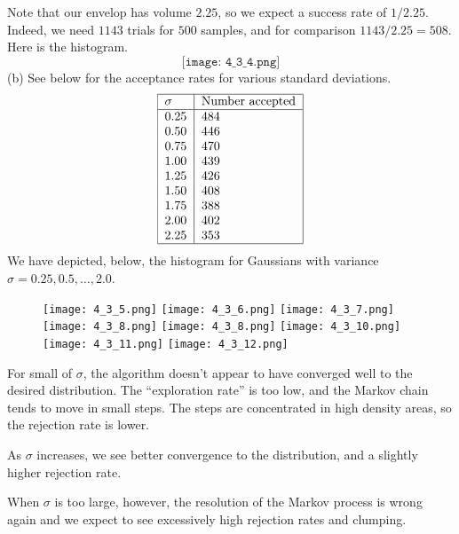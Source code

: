 \documentclass[12pt]{article}
\theoremstyle{remark}
\begin{document}
Note that our envelop has volume $2.25$, so we expect a success rate of $1/2.25$. Indeed, we need $1143$ trials for $500$ samples, and for comparison $1143/2.25 = 508$. Here is the histogram. 
\[
\texttt{[image: 4\_3\_4.png]}
\]
(b) See below for the acceptance rates for various standard deviations.
\[
\begin{tabular}{|l|l|}
\hline
$\sigma$ & Number accepted \\
\hline
$0.25$  & 484 \\
$0.50$ & 446 \\
$0.75$ & 470 \\
$1.00$  & 439 \\
$1.25$ & 426 \\
$1.50$ & 408 \\
$1.75$ & 388 \\
$2.00$ & 402 \\
$2.25$ & 353 \\
\hline
\end{tabular}
\]
We have depicted, below, the histogram for Gaussians with variance $\sigma = 0.25, 0.5, \ldots, 2.0$. 
\begin{figure}[!h]
\texttt{[image: 4\_3\_5.png]}
\texttt{[image: 4\_3\_6.png]} 
\texttt{[image: 4\_3\_7.png]}
\texttt{[image: 4\_3\_8.png]}
\texttt{[image: 4\_3\_8.png]}
\texttt{[image: 4\_3\_10.png]}
\texttt{[image: 4\_3\_11.png]}
\texttt{[image: 4\_3\_12.png]}



\end{figure}

For small of $\sigma$, the algorithm doesn't appear to have converged well to the desired distribution. The ``exploration rate'' is too low, and the Markov chain tends to move in small steps. The steps are concentrated in high density areas, so the rejection rate is lower. 

As $\sigma$ increases, we see better convergence to the distribution, and a slightly higher rejection rate. 

When $\sigma$ is too large, however, the resolution of the Markov process is wrong again and we expect to see excessively high rejection rates and clumping. 
\end{document}
